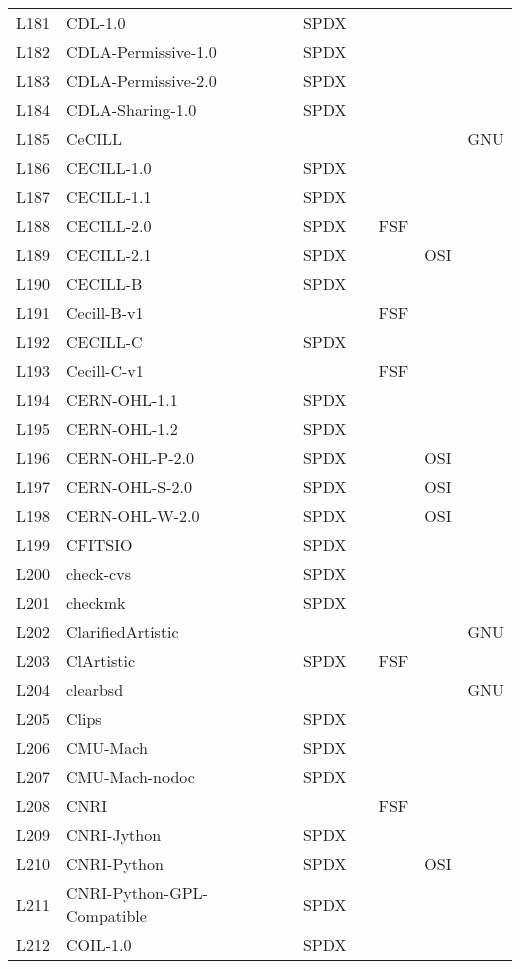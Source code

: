 \begin{longtable}[h]{m{2cm} | m{7cm} | c | c | c | c | c}
  L181 & CDL-1.0 & SPDX &  &  &  &  \\
  L182 & CDLA-Permissive-1.0 & SPDX &  &  &  &  \\
  L183 & CDLA-Permissive-2.0 & SPDX &  &  &  &  \\
  L184 & CDLA-Sharing-1.0 & SPDX &  &  &  &  \\
  L185 & CeCILL &  &  &  &  & GNU \\
  L186 & CECILL-1.0 & SPDX &  &  &  &  \\
  L187 & CECILL-1.1 & SPDX &  &  &  &  \\
  L188 & CECILL-2.0 & SPDX &  & FSF &  &  \\
  L189 & CECILL-2.1 & SPDX &  &  & OSI &  \\
  L190 & CECILL-B & SPDX &  &  &  &  \\
  L191 & Cecill-B-v1 &  &  & FSF &  &  \\
  L192 & CECILL-C & SPDX &  &  &  &  \\
  L193 & Cecill-C-v1 &  &  & FSF &  &  \\
  L194 & CERN-OHL-1.1 & SPDX &  &  &  &  \\
  L195 & CERN-OHL-1.2 & SPDX &  &  &  &  \\
  L196 & CERN-OHL-P-2.0 & SPDX &  &  & OSI &  \\
  L197 & CERN-OHL-S-2.0 & SPDX &  &  & OSI &  \\
  L198 & CERN-OHL-W-2.0 & SPDX &  &  & OSI &  \\
  L199 & CFITSIO & SPDX &  &  &  &  \\
  L200 & check-cvs & SPDX &  &  &  &  \\
  L201 & checkmk & SPDX &  &  &  &  \\
  L202 & ClarifiedArtistic &  &  &  &  & GNU \\
  L203 & ClArtistic & SPDX &  & FSF &  &  \\
  L204 & clearbsd &  &  &  &  & GNU \\
  L205 & Clips & SPDX &  &  &  &  \\
  L206 & CMU-Mach & SPDX &  &  &  &  \\
  L207 & CMU-Mach-nodoc & SPDX &  &  &  &  \\
  L208 & CNRI &  &  & FSF &  &  \\
  L209 & CNRI-Jython & SPDX &  &  &  &  \\
  L210 & CNRI-Python & SPDX &  &  & OSI &  \\
  L211 & CNRI-Python-GPL-Compatible & SPDX &  &  &  &  \\
  L212 & COIL-1.0 & SPDX &  &  &  &  \\

\end{longtable}
